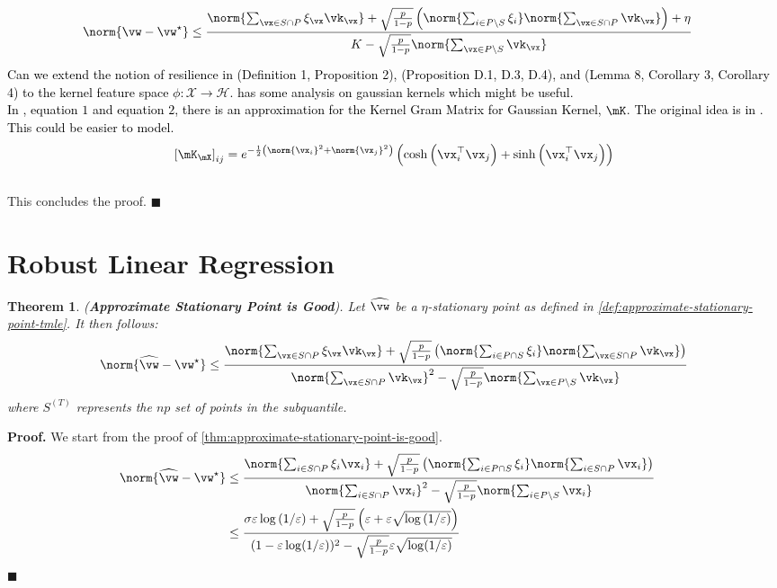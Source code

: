 \documentclass{article} %
\theoremstyle{plain}
\newtheorem{thm}{Theorem}
\theoremstyle{definition}
\theoremstyle{remark}
\newcommand{\ccref}[1]{\textcolor{black}{\cref{#1}}}
\begin{document}
\begin{appendices}
\begin{align}
		&\norm{\vw - \vw^{\star}} \leq \frac{\norm{\sum_{\vx \in S \cap P}\xi_\vx \vk_\vx} + \sqrt{\frac{p}{1-p}}\left(\norm{\sum_{i \in P \setminus S}\xi_i}\norm{\sum_{\vx \in S \cap P}\vk_\vx}\right) + \eta}{K - \sqrt{\frac{p}{1-p}}\norm{\sum_{\vx \in P\setminus S}\vk_\vx}}
	\end{align}
	\textcolor{black}{Can we extend the notion of resilience in \citep{steinhardt:2018}(Definition 1, Proposition 2),  \citep{awasthi:2022}(Proposition D.1, D.3, D.4), and \citep{Jambulapati2020}(Lemma 8, Corollary 3, Corollary 4) to the kernel feature space $\phi: \mathcal{X} \to \mathcal{H}$. \citep{Staib2019} has some analysis on gaussian kernels which might be useful. }\\
	\textcolor{black}{In \citep{liao:2020}, equation $1$ and equation $2$, there is an approximation for the Kernel Gram Matrix for Gaussian Kernel, $\mK$. The original idea is in \citep{rahimi:2007}. This could be easier to model. 
		\begin{equation}
			\left[\mK_\mX\right]_{ij} = e^{-\frac{1}{2}\left(\norm{\vx_i}^2+\norm{\vx_j}^2\right)}\left(\cosh\left(\vx_i^\top\vx_j\right) + \sinh\left(\vx_i^\top\vx_j\right)\right)
	\end{equation}}\\
	This concludes the proof.
	\hfill $\blacksquare$
	\clearpage
	\
	
	\section{Robust Linear Regression}
	\begin{thm}
		\label{thn:linear-regression-approximate-stationary-point-is-good}
		(\textbf{Approximate Stationary Point is Good}). Let $\widehat{\vw}$ be a $\eta$-stationary point as defined in \ccref{def:approximate-stationary-point-tmle}. It then follows:
		\begin{equation}
			\norm{\widehat{\vw} - \vw^{\star}} \leq \frac{\norm{\sum_{\vx \in S \cap P}\xi_\vx \vk_\vx} + \sqrt{\frac{p}{1-p}}\left(\norm{\sum_{i \in P\cap S}\xi_i}\norm{\sum_{\vx \in S \cap P}\vk_\vx}\right)}{\norm{\sum_{\vx \in S \cap P}\vk_\vx}^2 - \sqrt{\frac{p}{1-p}}\norm{\sum_{\vx \in P\setminus S}\vk_\vx}}
		\end{equation} where $S^{(T)}$ represents the $np$ set of points in the subquantile.
	\end{thm}
	\noindent
	{\bf Proof.}
		We start from the proof of \ccref{thm:approximate-stationary-point-is-good}. 
		\begin{align}
			\norm{\widehat{\vw} - \vw^{\star}} &\leq \frac{\norm{\sum_{i \in S \cap P}\xi_i \vx_i} + \sqrt{\frac{p}{1-p}}\left(\norm{\sum_{i \in P\cap S}\xi_i}\norm{\sum_{i \in S \cap P}\vx_i}\right)}{\norm{\sum_{i \in S \cap P}\vx_i}^2 - \sqrt{\frac{p}{1-p}}\norm{\sum_{i \in P\setminus S}\vx_i}}&&\\
			&\leq \frac{\sigma\varepsilon\log\left(1/\varepsilon\right) + \sqrt{\frac{p}{1-p}}\left(\varepsilon + \varepsilon \sqrt{\log\left(1/\varepsilon\right)}\right)}{(1-\varepsilon\log(1/\varepsilon))^2- \sqrt{\frac{p}{1-p}}\varepsilon\sqrt{\log(1/\varepsilon)}}&&
		\end{align}
	\hfill $\blacksquare$
	\fi
	\clearpage
	

\end{appendices}
\end{document}
